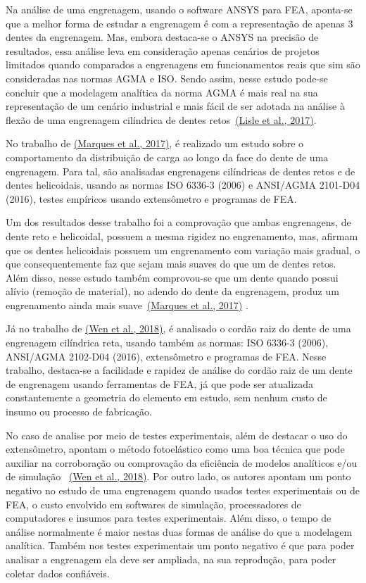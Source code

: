 \documentclass[12pt,a4paper]{article}
\begin{document}
Na análise de uma engrenagem, usando o software ANSYS para FEA,
aponta-se que a melhor forma de estudar a engrenagem é com a
representação de apenas 3 dentes da engrenagem. Mas, embora destaca-se o
ANSYS na precisão de resultados, essa análise leva em consideração
apenas cenários de projetos limitados quando comparados a engrenagens em
funcionamentos reais que sim são consideradas nas normas AGMA e ISO.
Sendo assim, nesse estudo pode-se concluir que a modelagem analítica da
norma AGMA é mais real na sua representação de um cenário industrial e
mais fácil de ser adotada na análise à flexão de uma engrenagem
cilíndrica de dentes retos~\hyperref[csl:3]{(Lisle et al., 2017)}.

No trabalho de \hyperref[csl:6]{(Marques et al., 2017)}, é realizado um estudo sobre o
comportamento da distribuição de carga ao longo da face do dente de uma
engrenagem. Para tal, são analisadas engrenagens cilíndricas de dentes
retos e de dentes helicoidais, usando as normas ISO 6336-3 (2006) e
ANSI/AGMA 2101-D04 (2016), testes empíricos usando extensômetro e
programas de FEA.

Um dos resultados desse trabalho foi a comprovação que ambas
engrenagens, de dente reto e helicoidal, possuem a mesma rigidez no
engrenamento, mas, afirmam que os dentes helicoidais possuem um
engrenamento com variação mais gradual, o que consequentemente faz que
sejam mais suaves do que um de dentes retos. Além disso, nesse estudo
também comprovou-se que um dente quando possui alívio (remoção de
material), no adendo do dente da engrenagem, produz um engrenamento
ainda mais suave~\hyperref[csl:6]{(Marques et al., 2017)} .

Já no trabalho de \hyperref[csl:7]{(Wen et al., 2018)}, é analisado o cordão raiz do dente
de uma engrenagem cilíndrica reta, usando também as normas: ISO 6336-3
(2006), ANSI/AGMA 2102-D04 (2016), extensômetro e programas de FEA.
Nesse trabalho, destaca-se a facilidade e rapidez de análise do cordão
raiz de um dente de engrenagem usando ferramentas de FEA, já que pode
ser atualizada constantemente a geometria do elemento em estudo, sem
nenhum custo de insumo ou processo de fabricação.

No caso de analise por meio de testes experimentais, além de destacar o
uso do extensômetro, apontam o método fotoelástico como uma boa técnica
que pode auxiliar na corroboração ou comprovação da eficiência de
modelos analíticos e/ou de simulação ~\hyperref[csl:7]{(Wen et al., 2018)}. Por outro
lado, os autores apontam um ponto negativo no estudo de uma engrenagem
quando usados testes experimentais ou de FEA, o custo envolvido em
softwares de simulação, processadores de computadores e insumos para
testes experimentais. Além disso, o tempo de análise normalmente é maior
nestas duas formas de análise do que a modelagem analítica. Também nos
testes experimentais um ponto negativo é que para poder analisar a
engrenagem ela deve ser ampliada, na sua reprodução, para poder coletar
dados confiáveis.
\end{document}
